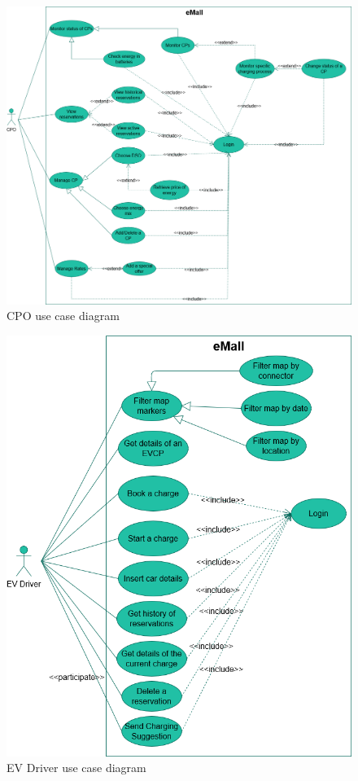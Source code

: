 \begin{figure}[hp]
    \centering
    \includegraphics[scale=0.4]{src/use_case_diagram/cpo.png}
    \caption{CPO use case diagram}
\end{figure}

\begin{figure}[hp]
    \centering
    \includegraphics[scale=0.6]{src/use_case_diagram/driver.png}
    \caption{EV Driver use case diagram}
\end{figure}

